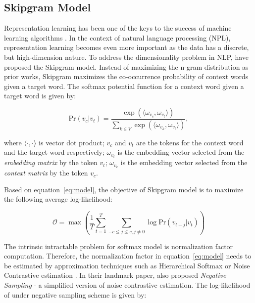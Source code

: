 \documentclass[letterpaper]{article}
\begin{document}
        \subsection{Skipgram Model}
            Representation learning has been one of the keys to the success of machine learning 
            algorithms \cite{bengioreprev}. In the context of natural language processing (NPL),
            representation learning becomes even more important as the data has a discrete, but
            high-dimension nature. To address the dimensionality problem in NLP, \cite{skipgram} have
            proposed the Skipgram model. Instead of maximizing the n-gram distribution
            as prior works, Skipgram maximizes the co-occurrence probability of context words given a
            target word. The softmax potential function for a context word given a target 
            word is given by:

            \begin{equation}
                \label{eq:model}
                \mbox{Pr} (v_c | v_t) = \frac{\exp{( \langle \omega_{v_c} ,  \omega_{v_t} \rangle )}}{\sum_{k \in V} \exp{( \langle \omega_{v_k} ,  \omega_{v_t} \rangle )}},
            \end{equation}
            
            \noindent
            where $ \langle \cdot ,  \cdot \rangle $ is vector dot product; $ v_c $ and $ v_t $ are the
            tokens for the context word and the target word respectively; $\omega_{v_t}$ is the embedding
            vector selected from the \emph{embedding matrix} by the token $v_t$; $\omega_{v_c}$ is the
            embedding vector selected from the \emph{context matrix} by the token $v_c$.

            Based on equation~\ref{eq:model}, the objective of Skipgram model is to maximize the following
            average log-likelihood:

            \begin{equation}
                \label{eq:avgloglikelihood}
                \mathcal{O} = \max \left( \frac{1}{T} \sum_{t=1}^{T} \sum_{-c \leq j \leq c, j \neq 0} \log \mbox{Pr} (v_{t+j} | v_t) \right)
            \end{equation}

            The intrinsic intractable problem for softmax model is normalization factor computation. 
            Therefore, the normalization factor in equation~\ref{eq:model} needs to be estimated by 
            approximation techniques such as Hierarchical Softmax \cite{hs} or Noise Contrastive estimation
            \cite{nce}. In their landmark paper, \cite{skipgram} also proposed \emph{Negative Sampling} - a 
            simplified version of noise contrastive estimation. The log-likelihood of 
            under negative sampling scheme is given by:
\end{document}
